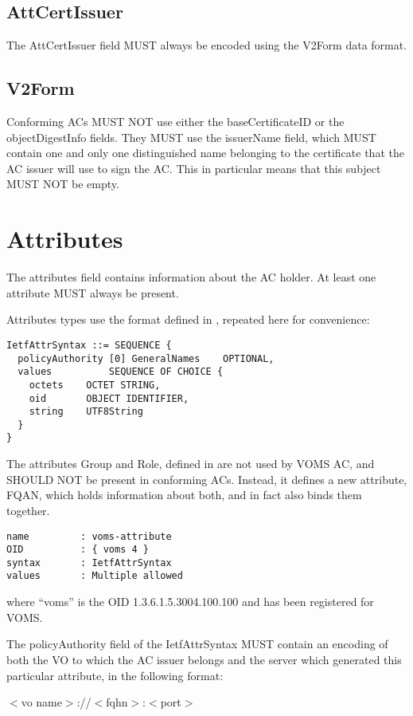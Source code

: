 \documentclass[a4]{article}
\begin{document}
\subsection{AttCertIssuer} 
The AttCertIssuer field MUST always be encoded using the V2Form data
format.

\subsection{V2Form}
Conforming ACs MUST NOT use either the baseCertificateID or the
objectDigestInfo fields. They MUST use the issuerName field, which
MUST contain one and only one distinguished name belonging to the
certificate that the AC issuer will use to sign the AC. This in
particular means that this subject MUST NOT be empty.

\section{Attributes}
The attributes field contains information about the AC holder.  At
least one attribute MUST always be present. 

Attributes types use the format defined in \cite{rfc3281}, repeated here
for convenience:

\begin{verbatim}
IetfAttrSyntax ::= SEQUENCE {
  policyAuthority [0] GeneralNames    OPTIONAL,
  values          SEQUENCE OF CHOICE {
    octets    OCTET STRING,
    oid       OBJECT IDENTIFIER,
    string    UTF8String
  }
}
\end{verbatim}

The attributes Group and Role, defined in \cite{rfc3281} are not used by
VOMS AC, and SHOULD NOT be present in conforming ACs.  Instead, it
defines a new attribute, FQAN, which holds information about both,
and in fact also binds them together.

\begin{verbatim}
name         : voms-attribute
OID          : { voms 4 }
syntax       : IetfAttrSyntax
values       : Multiple allowed
\end{verbatim}

where ``voms'' is the OID 1.3.6.1.5.3004.100.100 and has been
registered for VOMS.

The policyAuthority field of the IetfAttrSyntax MUST contain an
encoding of both the VO to which the AC issuer belongs and the server
which generated this particular attribute, in the following format:

\begin{center}
$<$vo name$>$://$<$fqhn$>$:$<$port$>$
\end{center}
\end{document}
